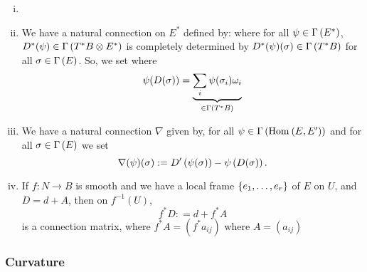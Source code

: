 \documentclass[main.tex]{subfiles}
\begin{document}
\begin{exmp}
\begin{enumerate}
\begin{enumerate}[(i)]
            \item {} 
            
            \item {} We have a natural connection on $E^*$ defined by:
            where for all $\psi \in \Gamma\left( E^* \right)$, $D^*(\psi) \in \Gamma\left( T^*B \otimes E^* \right)$ is completely determined by $D^*(\psi)(\sigma) \in \Gamma\left( T^*B \right)$ for all $\sigma \in \Gamma\left( E \right)$. So, we set 
            where 
            \[
            \psi(D(\sigma)) = \underbrace{\sum_{i} \psi(\sigma_i) \omega_i}_{\in \Gamma\left( T^*B \right)}
            \]
            
            \item {} We have a natural connection $\nabla$ given by, for all $\psi \in \Gamma\left( \text{Hom}_{}\left( E, E^\prime \right) \right)$ and for all $\sigma \in \Gamma\left( E \right)$ we set
            \[
            \nabla(\psi)(\sigma) := D^\prime\left(  \psi(\sigma)  \right) - \psi\left( D(\sigma) \right).
            \]
            
            \item If $f: N \to B$ is smooth and we have a local frame $\left\{e_1, \dots, e_r\right\}$ of $E$ on $U$, and $D = d + A$, then on $f^{-1}(U)$, 
            \[
            f^*D: = d + f^*A
            \]
            is a connection matrix, where $f^*A = (f^*a_{ij})$ where $A = (a_{ij})$
            
        \end{enumerate}
        
        \end{enumerate}
\end{exmp}
        
        \subsubsection{Curvature}
        
\end{document}
